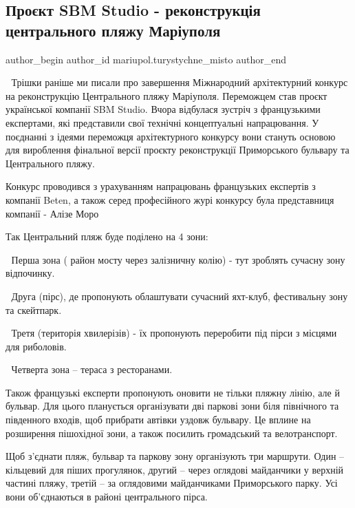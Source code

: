  
 
 
 
 

\subsection{Проєкт SBM Studio - реконструкція центрального пляжу Маріуполя}
\label{sec:27_10_2021.fb.mariupol.turystychne_misto.1.proekt_sbm_studio_rekonstrukcia_centralnyj_pljazh}

\ifcmt
 author_begin
   author_id mariupol.turystychne_misto
 author_end
\fi

🌊 Трішки раніше ми писали про завершення Міжнародний архітектурний конкурс на
реконструкцію Центрального пляжу Маріуполя. Переможцем став проєкт української
компанії SBM Studio. Вчора відбулася зустріч з французькими експертами, які
представили свої технічні концептуальні напрацювання.  У поєднанні з ідеями
переможця архітектурного конкурсу вони стануть основою для вироблення фінальної
версії проєкту реконструкції Приморського бульвару та Центрального пляжу.

Конкурс проводився з урахуванням напрацювань французьких експертів з компанії
Beten, а також серед професійного журі конкурсу була представниця компанії -
Алізе Моро

Так Центральний пляж буде поділено на 4 зони: 

🔷 Перша зона ( район мосту через залізничну колію) - тут зроблять сучасну зону відпочинку. \par
🔷 Друга (пірс), де пропонують облаштувати сучасний яхт-клуб, фестивальну зону та скейтпарк.\par
🔷 Третя (територія хвилерізів) - їх пропонують переробити під пірси з місцями для риболовів. \par
🔷 Четверта зона – тераса з ресторанами.\par

Також французькі експерти пропонують оновити не тільки пляжну лінію, але й
бульвар. Для цього планується організувати дві паркові зони біля північного та
південного входів, щоб прибрати автівки уздовж бульвару. Це вплине на
розширення пішохідної зони, а також посилить громадський та велотранспорт. 

Щоб з'єднати пляж, бульвар та паркову зону організують три маршрути. Один –
кільцевий для піших прогулянок, другий – через оглядові майданчики у верхній
частині пляжу, третій – за оглядовими майданчиками Приморського парку. Усі вони
об'єднаються в районі центрального пірса.

